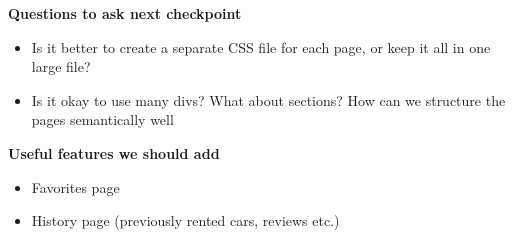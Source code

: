 \documentclass{article}
\begin{document}
\textbf{Questions to ask next checkpoint} 
\begin{itemize}
    \item Is it better to create a separate CSS file for each page, or keep it all in one large file?
    \item Is it okay to use many divs? What about sections? How can we structure the pages semantically well
\end{itemize}

\textbf{Useful features we should add}
\begin{itemize}
    \item Favorites page
    \item History page (previously rented cars, reviews etc.)
\end{itemize}
\end{document}
